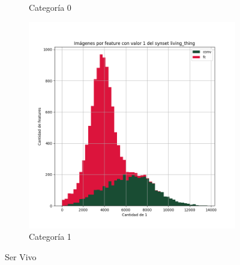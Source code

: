 \documentclass[12,twoside]{TFG-GM}
\theoremstyle{definition}
\theoremstyle{remark}
\begin{document}
\begin{figure}[ht]
\begin{subfigure}[b]{0.3\textwidth}
		\caption{Categoría 0}
	\end{subfigure}
	\begin{subfigure}[b]{0.3\textwidth}
		\includegraphics[width=\textwidth]  {Images/plots/25/synsets/Images_per_feature_of_1_category_living_thingall_layers.png}
		\caption{Categoría 1}
	\end{subfigure}       
	\caption{Ser Vivo}
\end{figure}
\end{document}
